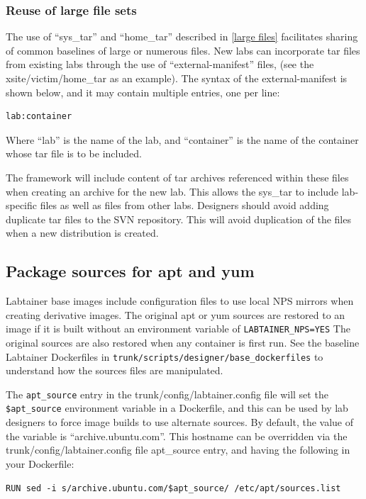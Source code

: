\documentclass[12pt]{article}
\begin{document}
\subsubsection{Reuse of large file sets}
\label{manifest}
The use of ``sys\_tar'' and ``home\_tar'' described in \ref{large files} facilitates sharing of common
baselines of large or numerous files.  New labs can incorporate tar files from existing
labs through the use of ``external-manifest'' files, (see the xsite/victim/home\_tar as
an example).   The syntax of the external-manifest is shown below, and it may contain
multiple entries, one per line:
\begin{verbatim}
lab:container
\end{verbatim}
\noindent Where ``lab'' is the name of the lab, and ``container'' is the name of the container
whose tar file is to be included.

The framework will include content of tar archives referenced within these files
when creating an archive for the new lab.  This allows the sys\_tar to include lab-specific files
as well as files from other labs.  Designers should avoid adding duplicate tar files to the SVN repository.
This will avoid duplication of the files when a new distribution is created.

\subsection{Package sources for apt and yum}
\label{package sources}
Labtainer base images include configuration files to use local NPS mirrors when creating derivative
images.  The original apt or yum sources are restored to an image if it is built without an environment
variable of {\tt LABTAINER\_NPS=YES}  The original sources are also restored when any container is first
run.  See the baseline Labtainer Dockerfiles in {\tt trunk/scripts/designer/base\_dockerfiles} to understand
how the sources files are manipulated.

The {\tt apt\_source} entry in the trunk/config/labtainer.config file will set the {\tt \$apt\_source}
environment variable in a Dockerfile, and this can be used by lab designers to force image builds to use
alternate sources.  By default, the value of the variable is ``archive.ubuntu.com''.  This hostname can be 
overridden via the trunk/config/labtainer.config file apt\_source entry, and having the following in your Dockerfile:
\begin{verbatim}
RUN sed -i s/archive.ubuntu.com/$apt_source/ /etc/apt/sources.list
\end{verbatim}
\end{document}

